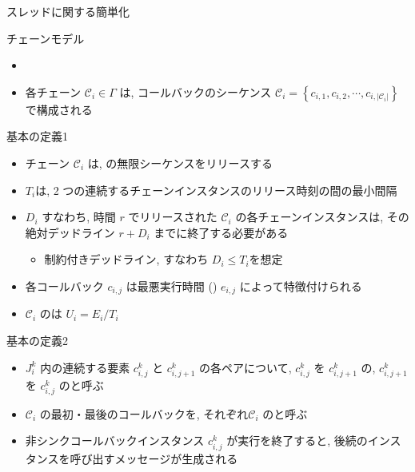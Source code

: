 \begin{frame}{スレッドに関する簡単化}
\end{frame}

\begin{frame}{チェーンモデル}

    \begin{itemize}
        \item {}\\
        \item 各チェーン $\mathcal{C}_{i} \in \Gamma$ は, コールバックのシーケンス $\mathcal{C}_{i}=\left\{c_{i, 1}, c_{i, 2}, \cdots, c_{i,\left|\mathcal{C}_{i}\right|}\right\}$ で構成される
    \end{itemize}
\end{frame}

\begin{frame}{基本の定義1}
    \begin{itemize}
        \item チェーン $\mathcal{C}_{i}$ は, の無限シーケンスをリリースする
        \item {} $T_{i}$は, 2 つの連続するチェーンインスタンスのリリース時刻の間の最小間隔
        \item {} $D_{i}$ すなわち, 時間 $r$ でリリースされた $\mathcal{C}_{i}$ の各チェーンインスタンスは, その絶対デッドライン $r+D_{i}$ までに終了する必要がある
              \begin{itemize}
                  \item 制約付きデッドライン, すなわち $D_{i} \leq T_{i}$を想定
              \end{itemize}
        \item 各コールバック $c_{i, j}$ は最悪実行時間 () $e_{i, j}$ によって特徴付けられる
        \item $\mathcal{C}_{i}$ のは $U_{i}=E_{i} / T_{i}$
    \end{itemize}
\end{frame}

\begin{frame}{基本の定義2}
    \begin{itemize}
        \item $J_{i}^{k}$ 内の連続する要素 $c_{i, j}^{k}$ と $c_{i, j+1}^{k}$ の各ペアについて, $c_{i, j}^{k}$ を $c_{i, j+1}^{k}$ の, $c_{i, j+1}^{k}$ を $c_{i, j}^{k}$ のと呼ぶ
        \item $\mathcal{C}_{i}$ の最初・最後のコールバックを, それぞれ$\mathcal{C}_{i}$ のと呼ぶ
        \item 非シンクコールバックインスタンス $c_{i, j}^{k}$ が実行を終了すると, 後続のインスタンスを呼び出すメッセージが生成される
    \end{itemize}
\end{frame}


